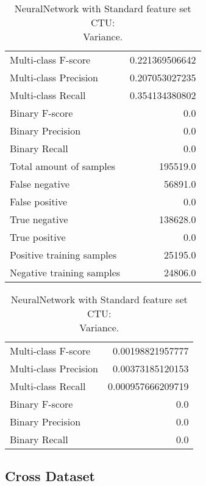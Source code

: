 \begin{table}[H]
\begin{minipage}{0.5\textwidth}
\caption{NeuralNetwork with Standard feature set CTU: \\Average.}
\centering
\begin{tabular}{l r}
\toprule
Multi-class F-score & 0.221369506642 \\
Multi-class Precision & 0.207053027235 \\
Multi-class Recall & 0.354134380802 \\
\midrule
Binary F-score & 0.0 \\
Binary Precision & 0.0 \\
Binary Recall & 0.0 \\
\midrule
Total amount of samples & 195519.0 \\
False negative & 56891.0 \\
False positive & 0.0 \\
True negative & 138628.0 \\
True positive & 0.0 \\
\midrule
Positive training samples & 25195.0 \\
Negative training samples & 24806.0 \\
\bottomrule
\end{tabular}
\end{minipage}
\hfillx
\begin{minipage}{0.5\textwidth}
\caption{NeuralNetwork with Standard feature set CTU: \\Variance.}
\centering
\begin{tabular}{l r}
\toprule
Multi-class F-score & 0.00198821957777 \\
Multi-class Precision & 0.00373185120153 \\
Multi-class Recall & 0.000957666209719 \\
\midrule
Binary F-score & 0.0 \\
Binary Precision & 0.0 \\
Binary Recall & 0.0 \\
\bottomrule
\end{tabular}
\end{minipage}
\end{table}

\newpage
\subsection{Cross Dataset}



